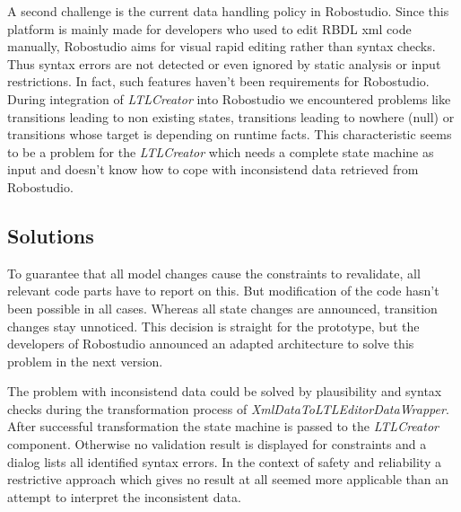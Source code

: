 A second challenge is the current data handling policy in Robostudio. Since this platform is mainly made for developers who used to edit RBDL xml code manually, Robostudio aims for visual rapid editing rather than syntax checks. Thus syntax errors are not detected or even ignored by static analysis or input restrictions. In fact, such features haven't been requirements for Robostudio. During integration of \emph{LTLCreator} into Robostudio we encountered problems like transitions leading to non existing states, transitions leading to nowhere (null) or transitions whose target is depending on runtime facts.
This characteristic seems to be a problem for the \emph{LTLCreator} which needs a complete state machine as input and doesn't know how to cope with inconsistend data retrieved from Robostudio.




\subsection{Solutions}

To guarantee that all model changes cause the constraints to revalidate, all relevant code parts have to report on this. But modification of the code hasn't been possible in all cases. Whereas all state changes are announced, transition changes stay unnoticed. This decision is straight for the prototype, but the developers of Robostudio announced an adapted architecture to solve this problem in the next version.


The problem with inconsistend data could be solved by plausibility and syntax checks during the transformation process of \emph{XmlDataToLTLEditorDataWrapper}. After successful transformation the state machine is passed to the \emph{LTLCreator} component. Otherwise no validation result is displayed for constraints and a dialog lists all identified syntax errors. In the context of safety and reliability a restrictive approach which gives no result at all seemed more applicable than an attempt to interpret the inconsistent data. 